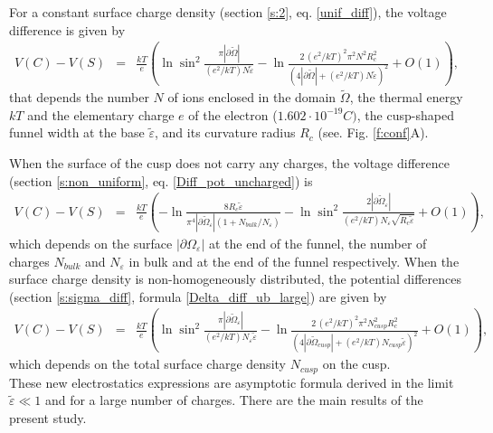 \documentclass[12pt]{article}
\newcommand{\ds}{\displaystyle}
\newcommand{\beq}{\begin{eqnarray}}
\newcommand{\eeq}{\end{eqnarray}}
\newcommand{\p}{\partial}
\newcommand{\eps}{\varepsilon}
\begin{document}
For a constant surface charge density (section \ref{s:2}, eq. \eqref{unif_diff}), the voltage difference is given by
\beq
V(C)-V(S)&=&\ds\frac{k T}{e}\left (\ln\sin^2\frac{\pi |\p\tilde\Omega|}{(e^2/kT) N\tilde\eps}-\ln\frac{2\,(e^2/kT)^2\pi^2
N^2 R_c^2 }{\left(4|\p\tilde\Omega| +(e^2/kT) N\tilde \eps\right)^2}+O(1) \right)\nonumber,
\eeq
that depends the number $N$ of ions enclosed in the domain $\tilde\Omega$, the thermal energy $kT$ and the elementary charge $e$ of the electron ($1.602\cdot10^{-19}C)$, the cusp-shaped funnel width at the base $\tilde \eps$, and its curvature radius $R_c$ (see. Fig. \ref{f:conf}A).

When the surface of the cusp does not carry any charges, the voltage difference (section \ref{s:non_uniform}, eq. \eqref{Diff_pot_uncharged}) is
\beq
V(C)-V(S)&=&\ds \frac{k T}{e}\left (- \ln  \frac{8 R_c\tilde\eps}{ \pi^4|\p\tilde\Omega_{\eps}|\left(1 +  N_{bulk}/N_{\eps}\right)}    -\ln\sin^2 \ds \frac{2|\p\tilde \Omega_\eps|}{\ds (e^2/kT) N_\eps\sqrt{ R_c \tilde\eps}} +O(1) \right),  \nonumber
\eeq
which depends on the surface $|\p\Omega_\eps|$ at the end of the funnel, the number of charges $N_{bulk}$ and $N_{\eps}$ in bulk and at the end of the funnel respectively.  When the surface charge density is non-homogeneously distributed, the potential differences (section \ref{s:sigma_diff}, formula \eqref{Delta_diff_ub_large}) are given by
\beq
V(C)-V(S)&=&\ds\frac{k T}{e}\left(\ln\sin^2\frac{\pi |\p\tilde\Omega_\eps|}{(e^2/kT) N_\eps\tilde\eps}-\ln\frac{2\,(e^2/kT)^2\pi^2
	N_{cusp}^2 R_c^2 }{\left(4|\p\tilde\Omega_{cusp}| +(e^2/kT) N_{cusp}\tilde \eps\right)^2}+O(1)  \right)\nonumber,
\eeq
which depends on the total surface charge density $N_{cusp}$ on the cusp. \\
These new electrostatics expressions are asymptotic formula derived in the limit $\tilde \eps\ll1$ and for a large number of charges. There are the main results of the present study.
\end{document}
